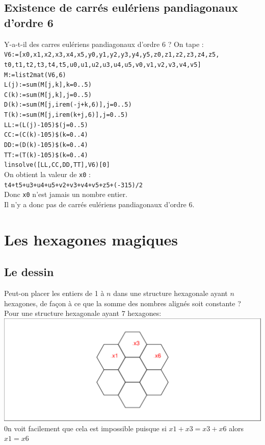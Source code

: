 \documentclass[a4paper,11pt]{book}
\begin{document}
\subsection{Existence de carr\'es eul\'eriens pandiagonaux d'ordre 6}
Y-a-t-il des carres eul\'eriens pandiagonaux d'ordre 6 ?
On tape :\\
{\tt V6:=[x0,x1,x2,x3,x4,x5,y0,y1,y2,y3,y4,y5,z0,z1,z2,z3,z4,z5,
t0,t1,t2,t3,t4,t5,u0,u1,u2,u3,u4,u5,v0,v1,v2,v3,v4,v5]}\\
{\tt M:=list2mat(V6,6)}\\
{\tt L(j):=sum(M[j,k],k=0..5)}\\
{\tt C(k):=sum(M[j,k],j=0..5)}\\
{\tt D(k):=sum(M[j,irem(-j+k,6)],j=0..5)}\\
{\tt T(k):=sum(M[j,irem(k+j,6)],j=0..5)}\\
{\tt LL:=(L(j)-105)\$(j=0..5)}\\
{\tt CC:=(C(k)-105)\$(k=0..4)}\\
{\tt DD:=(D(k)-105)\$(k=0..4)}\\
{\tt TT:=(T(k)-105)\$(k=0..4)}\\
{\tt linsolve([LL,CC,DD,TT],V6)[0]}\\
On obtient la valeur de {\tt x0} :\\
{\tt t4+t5+u3+u4+u5+v2+v3+v4+v5+z5+(-315)/2}\\
Donc {\tt x0} n'est jamais un nombre entier.\\
Il n'y a donc pas de carr\'es eul\'eriens pandiagonaux d'ordre 6. 

\section{Les hexagones magiques}
\subsection{Le dessin}
Peut-on placer les entiers de 1 \`a $n$ dans une structure hexagonale ayant $n$
 hexagones, de façon \`a ce que la somme des nombres align\'es soit constante ?\\

Pour une structure hexagonale ayant $7$ hexagones:\\

\includegraphics[width=\textwidth]{hexagone2}\\
 0n voit facilement que cela est impossible puisque si
$x1+x3=x3+x6$ alors $x1=x6$\\
\end{document}
